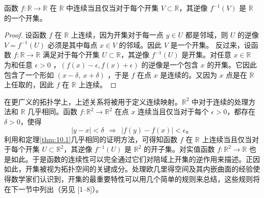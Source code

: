 \begin{theorem}\label{thm:10.1} 
     函数 $f:\mathbb{R}\rightarrow \mathbb{R}$ 在 $\mathbb{R}$ 中连续当且仅当对于每个开集 $V\subset \mathbb{R}$，其逆像 $f^{-1} (V)$ 是 $\mathbb{R}$ 的一个开集。
\end{theorem}
\begin{proof}
设函数 $\displaystyle f$ 在 $\displaystyle \mathbb{R}$ 上连续，因为开集对于每一点 $\displaystyle y\in U$ 都是邻域，则 $\displaystyle U$ 的逆像 $\displaystyle V=f^{-1}( U)$ 必须是其中每点 $\displaystyle x\in V$ 的邻域。因此 $\displaystyle V$ 是一个开集。
    反过来，设函数 $f:\mathbb{R}\rightarrow \mathbb{R}$ 满足对于每个开集 $U\subset \mathbb{R}$，其逆像 $f^{-1} (U)$ 是开集。对任意 $x\in \mathbb{R}$ 为和任意 $\epsilon  >0$ ，$(f(x)-\epsilon ,f(x)+\epsilon )$ 的逆像是一个包含 $\displaystyle x$ 的开集。它因此包含了一个形如 $\displaystyle ( x-\delta ,\ x+\delta )$ ，于是 $\displaystyle f$ 在点 $\displaystyle x$ 是连续的。又因为 $\displaystyle x$ 点是在 $\mathbb{R}$ 上任取的，因此 $\displaystyle f$ 在 $\mathbb{R}$ 上连续。
\end{proof}
    在更广义的拓扑学上，上述关系将被用于定义连续映射。$\mathbb{R}^{2}$ 中对于连续的处理方法和 $\displaystyle \mathbb{R}$ 几乎相同。函数 $f:\mathbb{R}^{2}\rightarrow \mathbb{R}^{2}$ 在点 $x$ 连续当且仅当对于每个 $\epsilon  >0$，都存在 $\delta  >0$，使得
\begin{equation*}
|y-x|< \delta \ \ \Rightarrow \ \ |f(y)-f(x)|< \epsilon 。
\end{equation*}
利用和定理\ref{thm:10.1}几乎相同的证明方法，可得知函数 $f$ 在 $\displaystyle \mathbb{R}$ 上连续当且仅当对于每个开集 $U\subset \mathbb{R}^{2}$，其逆像 $f^{-1} (U)$ 是 $\mathbb{R}^{2}$ 的开子集。对实值函数 $f:\mathbb{R}^{2}\rightarrow \mathbb{R}$ 也是如此。于是函数的连续性可以完全通过它们对陪域上开集的逆作用来描述。正因如此，开集被视为拓扑空间的关键成分。处理欧几里得空间及其内嵌曲面的经验使得数学家们认识到，开集的最重要特性可以用几个简单的规则来总结，这些规则将在下一节中列出（另见 [1–8]）。